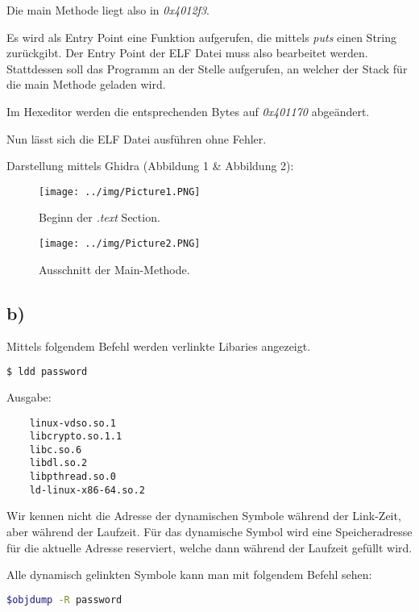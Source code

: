 Die main Methode liegt also in \textit{0x4012f3}.

Es wird als Entry Point eine Funktion aufgerufen, die mittels \textit{puts} einen String zurückgibt.
Der Entry Point der ELF Datei muss also bearbeitet werden.
Stattdessen soll das Programm an der Stelle aufgerufen, an welcher der Stack für die main Methode geladen wird.

Im Hexeditor werden die entsprechenden Bytes auf \textit{0x401170} abgeändert.

Nun lässt sich die ELF Datei ausführen ohne Fehler.

Darstellung mittels Ghidra (Abbildung 1 \& Abbildung 2):

\begin{figure} [!ht]
\centering
\texttt{[image: ../img/Picture1.PNG]}
\caption{Beginn der \textit{.text} Section.}
\end{figure}

\begin{figure} [!ht]
\centering
\texttt{[image: ../img/Picture2.PNG]}
\caption{Ausschnitt der Main-Methode.}
\end{figure}

\newpage

\subsection*{b)}

Mittels folgendem Befehl werden verlinkte Libaries angezeigt.

\begin{lstlisting}[language=bash]
    $ ldd password
\end{lstlisting}

Ausgabe:

\begin{lstlisting}
    linux-vdso.so.1
    libcrypto.so.1.1
    libc.so.6
    libdl.so.2
    libpthread.so.0
    ld-linux-x86-64.so.2
\end{lstlisting}

Wir kennen nicht die Adresse der dynamischen Symbole während der Link-Zeit, aber während der Laufzeit.
Für das dynamische Symbol wird eine Speicheradresse für die aktuelle Adresse reserviert, welche
dann während der Laufzeit gefüllt wird.

Alle dynamisch gelinkten Symbole kann man mit folgendem Befehl sehen:

\begin{lstlisting}[language=bash]
    $objdump -R password
\end{lstlisting}

